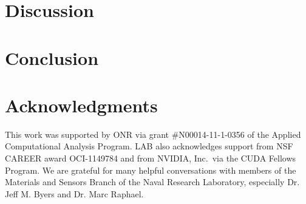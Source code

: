 \documentclass[final,5p,times,twocolumn]{elsarticle}
\begin{document}
\section{Discussion} \label{sec:discussion}


\section{Conclusion}





\section*{Acknowledgments}
 This work was supported by ONR via grant \#N00014-11-1-0356 of the Applied Computational Analysis Program. LAB also acknowledges support from NSF CAREER award OCI-1149784 and from NVIDIA, Inc.\ via the CUDA Fellows Program. 
 We are grateful for many helpful conversations with members of the Materials and Sensors Branch of the Naval Research Laboratory, especially Dr. Jeff M. Byers and Dr. Marc Raphael.



\end{document}
